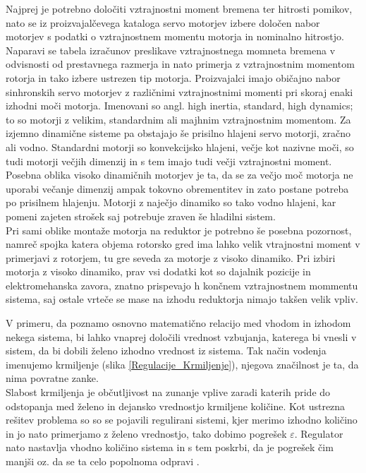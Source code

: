 \documentclass[a4paper,twoside,openright,12pt]{book}
\begin{document}
Najprej je potrebno določiti vztrajnostni moment bremena ter hitrosti pomikov, nato se iz proizvajalčevega kataloga servo motorjev izbere določen nabor motorjev s podatki o vztrajnostnem momentu motorja in nominalno hitrostjo. Naparavi se tabela izračunov preslikave vztrajnostnega momneta bremena v odvisnosti od prestavnega razmerja in nato primerja z vztrajnostnim momentom rotorja in tako izbere ustrezen tip motorja. Proizvajalci imajo običajno nabor sinhronskih servo motorjev z različnimi vztrajnostnimi momenti pri skoraj enaki izhodni moči motorja. Imenovani so angl. high inertia, standard, high dynamics; to so motorji z velikim, standardnim ali majhnim vztrajnostnim momentom. Za izjemno dinamične sisteme pa obstajajo še prisilno hlajeni servo motorji, zračno ali vodno. Standardni motorji so konvekcijsko hlajeni, večje kot nazivne moči, so tudi motorji večjih dimenzij in s tem imajo tudi večji vztrajnostni moment. Posebna oblika visoko dinamičnih motorjev je ta, da se za večjo moč motorja ne uporabi večanje dimenzij ampak tokovno obrementitev in zato postane potreba po prisilnem hlajenju. Motorji z naječjo dinamiko so tako vodno hlajeni, kar pomeni zajeten strošek saj potrebuje zraven še hladilni sistem.\\   
Pri sami oblike montaže motorja na reduktor je potrebno še posebna pozornost, namreč spojka katera objema rotorsko gred ima lahko velik vtrajnostni moment v primerjavi z rotorjem, tu gre seveda za motorje z visoko dinamiko. Pri izbiri motorja z visoko dinamiko, prav vsi dodatki kot so dajalnik pozicije in elektromehanska zavora, znatno prispevajo h končnem vztrajnostnem mommentu sistema, saj ostale vrteče se mase na izhodu reduktorja nimajo takšen velik vpliv. 

V primeru, da poznamo osnovno matematično relacijo med vhodom in izhodom nekega
sistema, bi lahko vnaprej določili vrednost vzbujanja, katerega bi vnesli v sistem, da bi dobili želeno izhodno vrednost iz sistema. Tak način vodenja imenujemo krmiljenje (slika \ref{Regulacije_Krmiljenje}), njegova značilnost je ta, da nima povratne zanke.\\

Slabost krmiljenja je občutljivost na zunanje vplive zaradi katerih pride do odstopanja med želeno in dejansko vrednostjo krmiljene količine. Kot ustrezna rešitev problema so so se pojavili regulirani sistemi, kjer merimo izhodno količino in jo nato primerjamo z želeno vrednostjo, tako dobimo pogrešek $\varepsilon$. Regulator nato nastavlja vhodno količino sistema in s tem poskrbi, da je pogrešek čim manjši oz. da se ta celo popolnoma odpravi \cite{pribec2014optimizacija}. 
\end{document}
